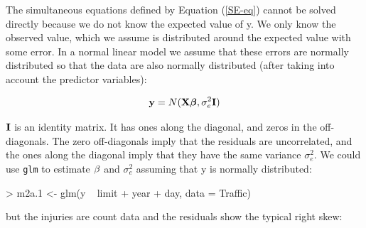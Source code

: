\documentclass{article}
\begin{document}
The simultaneous equations defined by Equation (\ref{SE-eq}) cannot be solved directly because we do not know the expected value of y. We only know the observed value, which we assume is distributed around the expected value with some error. In a normal linear model we assume that these errors are normally distributed so that the data are also normally distributed (after taking into account the predictor variables):

\begin{equation}
{\bf y} = N({\bf X}{\bm \beta}, \sigma^{2}_{e}{\bf I})
\end{equation}	

${\bf I}$ is an identity matrix. It has ones along the diagonal, and zeros in the off-diagonals. The zero off-diagonals imply that the residuals are uncorrelated, and the ones along the diagonal imply that they have the same variance  $\sigma^{2}_{e}$. We could use \texttt{glm} to estimate ${\bf \beta}$ and  $\sigma^{2}_{e}$ assuming that y is normally distributed: 

\begin{Schunk}
\begin{Sinput}
> m2a.1 <- glm(y ~ limit + year + day, data = Traffic)
\end{Sinput}
\end{Schunk}

but the injuries are count data and the residuals show the typical right skew:

\iftalk
\else
\begin{Schunk}
\end{Schunk}
\fi
\end{document}
